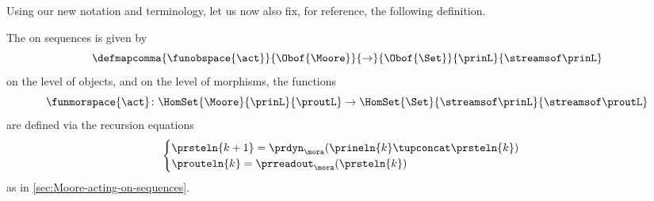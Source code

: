 Using our new notation and terminology, let us now also fix, for reference, the following definition.

\begin{definition}
    \label{def:moore-standard-action-on-sequences}
    The  on sequences is given by
    \begin{equation}
        \defmapcomma{\funobspace{\act}}
        {\Obof{\Moore}}
        {\to}
        {\Obof{\Set}}
        {\prinL}
        {\streamsof\prinL}
    \end{equation}
    on the level of objects, and on the level of morphisms, the functions
    \begin{equation}
        \funmorspace{\act} \colon \HomSet{\Moore}{\prinL}{\proutL} \to \HomSet{\Set}{\streamsof\prinL }{\streamsof\proutL}
    \end{equation}
    are defined via the recursion equations
    \begin{equation}
        \begin{cases}
            \prsteln{k+1} = \prdyn_\mora(\prineln{k} \tupconcat \prsteln{k}) \\
            \prouteln{k} = \prreadout_\mora(\prsteln{k})
        \end{cases}
    \end{equation}
    as in \cref{sec:Moore-acting-on-sequences}.
\end{definition}

